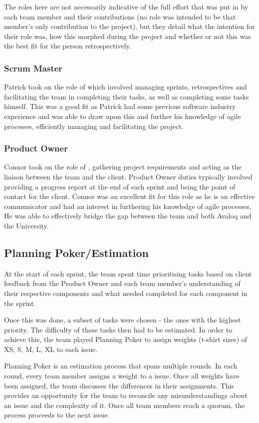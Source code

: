 \documentclass{l3proj}
\begin{document}
The roles here are not necessarily indicative of the full effort that was put in by each team member and their contributions (no role was intended to be that member's only contribution to the project), but they detail what the intention for their role was, how this morphed during the project and whether or not this was the best fit for the person retrospectively.

\subsubsection{Scrum Master}
Patrick took on the role of  which involved managing sprints, retrospectives and facilitating the team in completing their tasks, as well as completing some tasks himself. This was a good fit as Patrick had some previous software industry experience and was able to draw upon this and further his knowledge of agile processes, efficiently managing and facilitating the project.

\subsubsection{Product Owner}
Connor took on the role of , gathering project requirements and acting as the liaison between the team and the client. Product Owner duties typically involved providing a progress report at the end of each sprint and being the point of contact for the client. Connor was an excellent fit for this role as he is an effective communicator and had an interest in furthering his knowledge of agile processes. He was able to effectively bridge the gap between the team and both Avaloq and the University.

\subsection{Planning Poker/Estimation}
At the start of each sprint, the team spent time prioritising tasks based on client feedback from the Product Owner and each team member's understanding of their respective components and what needed completed for each component in the sprint.

Once this was done, a subset of tasks were chosen - the ones with the highest priority. The difficulty of these tasks then had to be estimated. In order to achieve this, the team played Planning Poker \cite{planning-poker} to assign weights (t-shirt sizes) of XS, S, M, L, XL to each issue.

Planning Poker is an estimation process that spans multiple rounds. In each round, every team member assigns a weight to a issue. Once all weights have been assigned, the team discusses the differences in their assignments. This provides an opportunity for the team to reconcile any misunderstandings about an issue and the complexity of it. Once all team members reach a quorum, the process proceeds to the next issue.
\end{document}
